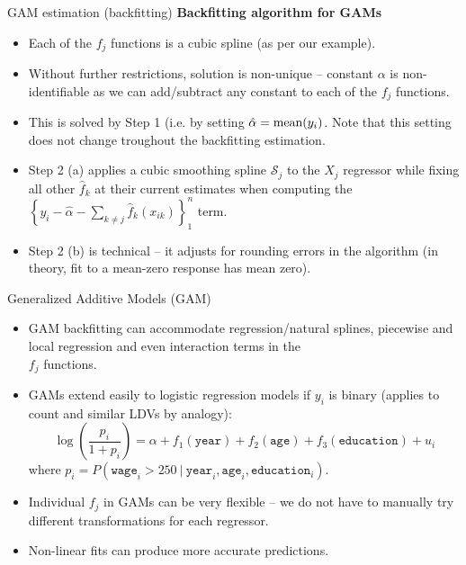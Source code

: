 \documentclass{beamer}
\begin{document}
\begin{frame}{GAM estimation (backfitting)}
\textbf{Backfitting algorithm for GAMs}\\ \medskip
\begin{itemize}
    \item Each of the $f_j$ functions is a cubic spline (as per our example).
    \smallskip
    \item Without further restrictions, solution is non-unique -- constant $\alpha$ is non-identifiable as we can add/subtract any constant to each of the $f_j$ functions.
    \smallskip
    \item This is solved by Step 1 (i.e. by setting $\hat{\alpha} = \textnormal{mean}(y_i)$. Note that this setting does not change troughout the backfitting estimation.
    \smallskip
    \item Step 2 (a) applies a cubic smoothing spline $\mathcal{S}_j$ to the $X_j$ regressor while fixing all other $\hat{f}_k$ at their current estimates when computing the $\left\lbrace y_i - \hat{\alpha} - \sum_{k \neq j} \hat{f}_k (x_{ik}) \right\rbrace_1^n$ term.
    \smallskip
    \item Step 2 (b) is technical -- it adjusts for rounding errors in the algorithm (in theory, fit to a mean-zero response has mean zero).
\end{itemize}
\end{frame}
\begin{frame}{Generalized Additive Models (GAM)}
\begin{itemize}
    \item[\ding{51}] GAM backfitting can accommodate regression/natural splines, piecewise and local regression and even interaction terms in the \\$f_j$ functions.
    \bigskip
    \item[\ding{51}] GAMs extend easily to logistic regression models if $y_i$ is binary (applies to count and similar LDVs by analogy):
    $$ \log \left( \frac{p_i}{1+p_i}
    \right) = \alpha + f_1(\texttt{year}) + f_2(\texttt{age}) + f_3(\texttt{education}) + u_i$$
where $p_i = P(\texttt{wage}_i > 250~|~ \texttt{year}_i, \texttt{age}_i, \texttt{education}_i)$.
\bigskip
\item[\ding{51}] Individual $f_j$ in GAMs can be very flexible -- we do not have to manually try different transformations for each regressor.
\bigskip
\item[\ding{51}] Non-linear fits can produce more accurate predictions.
\end{itemize}
\end{frame}
\end{document}
